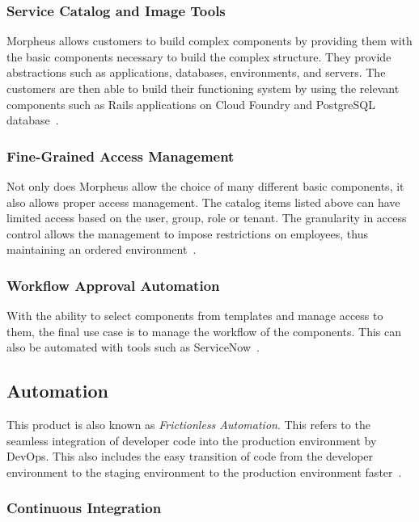 \subsubsection{Service Catalog and Image Tools}

Morpheus allows customers to build complex components by providing them with 
the basic components necessary to build the complex structure. They provide 
abstractions such as applications, databases, environments, and servers. The 
customers are then able to build their functioning system by using the relevant 
components such as Rails applications on Cloud Foundry and PostgreSQL 
database~\cite{hid-sp18-416-www-morpheus-control}.

\subsubsection{Fine-Grained Access Management}

Not only does Morpheus allow the choice of many different basic components, it 
also allows proper access management. The catalog items listed above can have 
limited access based on the user, group, role or tenant. The granularity in 
access control allows the management to impose restrictions on employees, thus 
maintaining an ordered environment~\cite{hid-sp18-416-www-morpheus-control}.

\subsubsection{Workflow Approval Automation}

With the ability to select components from templates and manage access to them, 
the final use case is to manage the workflow of the components. This can also 
be automated with tools such as 
ServiceNow~\cite{hid-sp18-416-www-morpheus-control}. 

\subsection{Automation}

This product is also known as \textit{Frictionless Automation}. This refers to 
the seamless integration of developer code into the production environment by 
DevOps. This also includes the easy transition of code from the developer 
environment to the staging environment to the production 
environment faster~\cite{hid-sp18-416-www-morpheus-product-guide}. 

\subsubsection{Continuous Integration}

